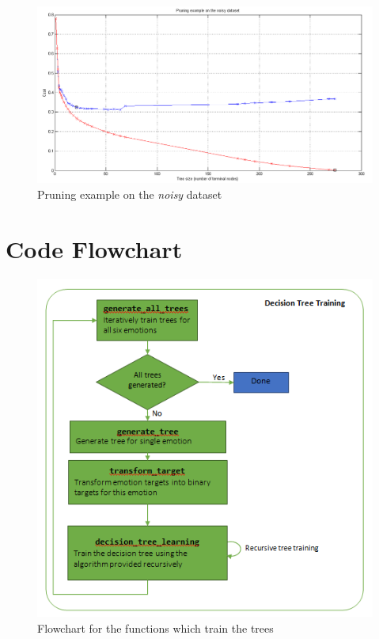 \documentclass[a4paper]{article}
\begin{document}
\begin{figure}[H]
\center
\includegraphics[width=1\columnwidth]{pruneNoisy} %
\caption{Pruning example on the \emph{noisy} dataset}
\label{pruneNoisy}
\end{figure}

\clearpage


\section{Code Flowchart}

\begin{figure}[H]
\center
\includegraphics[width=0.6\columnwidth]{flowchartBuildTree}
\caption{Flowchart for the functions which train the trees}
\label{flowchartBuildTree}
\end{figure}
\end{document}
